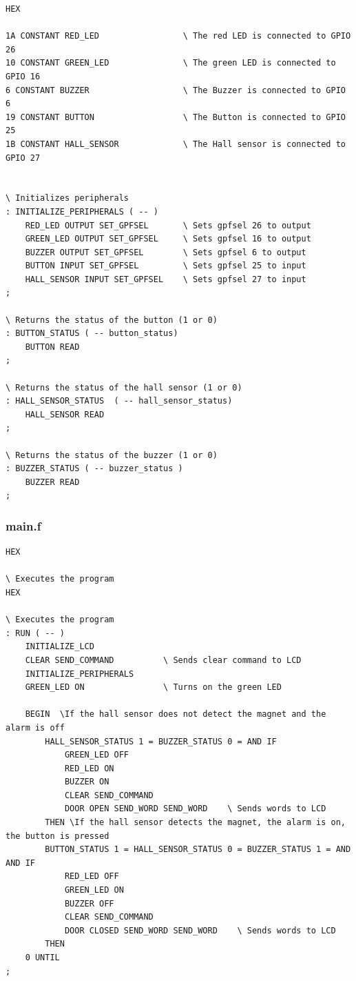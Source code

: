 \documentclass[]{article}
\begin{document}
\begin{verbatim}
HEX

1A CONSTANT RED_LED                 \ The red LED is connected to GPIO 26
10 CONSTANT GREEN_LED               \ The green LED is connected to GPIO 16
6 CONSTANT BUZZER                   \ The Buzzer is connected to GPIO 6
19 CONSTANT BUTTON                  \ The Button is connected to GPIO 25
1B CONSTANT HALL_SENSOR             \ The Hall sensor is connected to GPIO 27


\ Initializes peripherals 
: INITIALIZE_PERIPHERALS ( -- )
    RED_LED OUTPUT SET_GPFSEL       \ Sets gpfsel 26 to output 
    GREEN_LED OUTPUT SET_GPFSEL     \ Sets gpfsel 16 to output 
    BUZZER OUTPUT SET_GPFSEL        \ Sets gpfsel 6 to output 
    BUTTON INPUT SET_GPFSEL         \ Sets gpfsel 25 to input 
    HALL_SENSOR INPUT SET_GPFSEL    \ Sets gpfsel 27 to input 
;

\ Returns the status of the button (1 or 0)
: BUTTON_STATUS ( -- button_status)
    BUTTON READ 
;

\ Returns the status of the hall sensor (1 or 0)
: HALL_SENSOR_STATUS  ( -- hall_sensor_status)
    HALL_SENSOR READ
;

\ Returns the status of the buzzer (1 or 0)
: BUZZER_STATUS ( -- buzzer_status )
    BUZZER READ
;
\end{verbatim}

\subsubsection{main.f}

\begin{verbatim}
HEX

\ Executes the program
HEX

\ Executes the program
: RUN ( -- )
    INITIALIZE_LCD
    CLEAR SEND_COMMAND          \ Sends clear command to LCD
    INITIALIZE_PERIPHERALS      
    GREEN_LED ON                \ Turns on the green LED
    
    BEGIN  \If the hall sensor does not detect the magnet and the alarm is off
        HALL_SENSOR_STATUS 1 = BUZZER_STATUS 0 = AND IF   
            GREEN_LED OFF       
            RED_LED ON 
            BUZZER ON
            CLEAR SEND_COMMAND
            DOOR OPEN SEND_WORD SEND_WORD    \ Sends words to LCD
        THEN \If the hall sensor detects the magnet, the alarm is on, the button is pressed  
        BUTTON_STATUS 1 = HALL_SENSOR_STATUS 0 = BUZZER_STATUS 1 = AND AND IF
            RED_LED OFF             
            GREEN_LED ON 
            BUZZER OFF
            CLEAR SEND_COMMAND
            DOOR CLOSED SEND_WORD SEND_WORD    \ Sends words to LCD
        THEN
    0 UNTIL
;

\end{verbatim}
\end{document}

